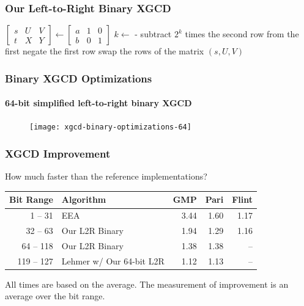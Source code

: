 \documentclass{beamer}
\newcommand{\ZZgez}{\mathbb{Z}_{\ge 0}}
\newcommand{\matrixThreeTwo}[6]{\left[ \begin{array}{rrr} #1 & #2 & #3 \\ #4 & #5 & #6 \end{array} \right]}
\newcommand{\smallfont}{\fontsize{6pt}{7.2}\selectfont}
\begin{document}
\begin{frame}
\frametitle{Our Left-to-Right Binary XGCD}
\begin{algorithmic}[1]
 \Comment{$a, b \in \ZZgez$}
\State $\matrixThreeTwo{s}{U}{V}{t}{X}{Y} \gets \matrixThreeTwo{a}{1}{0}{b}{0}{1}$
	\State $k \gets $  - 
	\State subtract $2^k$ times the second row from the first
	 negate the first row \EndIf
	 swap the rows of the matrix \EndIf
\EndWhile
\State \Return $(s, U, V)$
\EndProcedure
\end{algorithmic}
\end{frame}

\begin{frame}
\frametitle{Binary XGCD Optimizations}
\framesubtitle{64-bit simplified left-to-right binary XGCD}
\begin{figure}
\texttt{[image: xgcd-binary-optimizations-64]}
\end{figure}
\end{frame}


\begin{frame}
\frametitle{XGCD Improvement}

How much faster than the reference implementations?
\begin{table}
\centering
\begin{tabular}{ | r | l | r | r | r | }
\hline
Bit Range & Algorithm & GMP & Pari & Flint \\
\hline
1 -- 31 & EEA & 3.44 & 1.60 & 1.17 \\
32 -- 63 & Our L2R Binary & 1.94 & 1.29 & 1.16 \\
64 -- 118 & Our L2R Binary & 1.38 & 1.38 & -- \\
119 -- 127 & Lehmer w/ Our 64-bit L2R & 1.12 & 1.13 & -- \\
\hline
\end{tabular}
\end{table}

\bigskip
\smallfont
All times are based on the average.  The measurement of improvement is an average over the bit range.
\end{frame}
\end{document}
